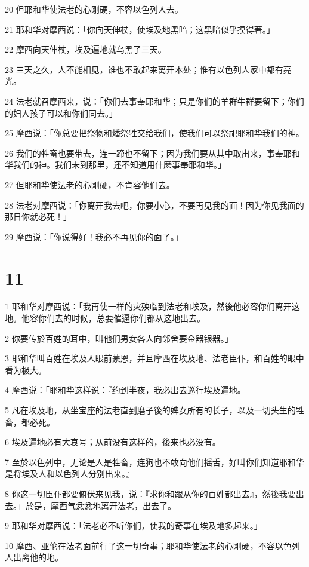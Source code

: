 \par 20 但耶和华使法老的心刚硬，不容以色列人去。
\par 21 耶和华对摩西说：「你向天伸杖，使埃及地黑暗；这黑暗似乎摸得著。」
\par 22 摩西向天伸杖，埃及遍地就乌黑了三天。
\par 23 三天之久，人不能相见，谁也不敢起来离开本处；惟有以色列人家中都有亮光。
\par 24 法老就召摩西来，说：「你们去事奉耶和华；只是你们的羊群牛群要留下；你们的妇人孩子可以和你们同去。」
\par 25 摩西说：「你总要把祭物和燔祭牲交给我们，使我们可以祭祀耶和华我们的神。
\par 26 我们的牲畜也要带去，连一蹄也不留下；因为我们要从其中取出来，事奉耶和华我们的神。我们未到那里，还不知道用什麽事奉耶和华。」
\par 27 但耶和华使法老的心刚硬，不肯容他们去。
\par 28 法老对摩西说：「你离开我去吧，你要小心，不要再见我的面！因为你见我面的那日你就必死！」
\par 29 摩西说：「你说得好！我必不再见你的面了。」

\chapter{11}

\par 1 耶和华对摩西说：「我再使一样的灾殃临到法老和埃及，然後他必容你们离开这地。他容你们去的时候，总要催逼你们都从这地出去。
\par 2 你要传於百姓的耳中，叫他们男女各人向邻舍要金器银器。」
\par 3 耶和华叫百姓在埃及人眼前蒙恩，并且摩西在埃及地、法老臣仆，和百姓的眼中看为极大。
\par 4 摩西说：「耶和华这样说：『约到半夜，我必出去巡行埃及遍地。
\par 5 凡在埃及地，从坐宝座的法老直到磨子後的婢女所有的长子，以及一切头生的牲畜，都必死。
\par 6 埃及遍地必有大哀号；从前没有这样的，後来也必没有。
\par 7 至於以色列中，无论是人是牲畜，连狗也不敢向他们摇舌，好叫你们知道耶和华是将埃及人和以色列人分别出来。』
\par 8 你这一切臣仆都要俯伏来见我，说：『求你和跟从你的百姓都出去』，然後我要出去。」於是，摩西气忿忿地离开法老，出去了。
\par 9 耶和华对摩西说：「法老必不听你们，使我的奇事在埃及地多起来。」
\par 10 摩西、亚伦在法老面前行了这一切奇事；耶和华使法老的心刚硬，不容以色列人出离他的地。

